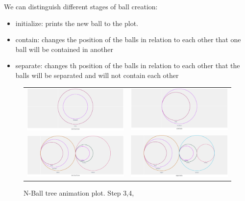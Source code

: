 We can distinguish different stages of ball creation:
\begin{itemize}
	\item initialize: prints the new ball to the plot.
	\item  contain: changes the position of the balls in relation to each other that one ball will be contained in another
	\item  separate: changes th position of the balls in relation to each other that the balls will be separated and will not contain each other
\end{itemize}

\begin{figure}[H]
	\begin{tabular}{cc}
		\includegraphics[width=55mm]{res/animation1.png} & \includegraphics[width=55mm]{res/animation2.png} \\
		\includegraphics[width=55mm]{res/animation3.png} & \includegraphics[width=55mm]{res/animation4.png} \\
	\end{tabular}
	\caption{N-Ball tree animation plot. Step 3,4, }
	\label{fig:animation}
\end{figure}

